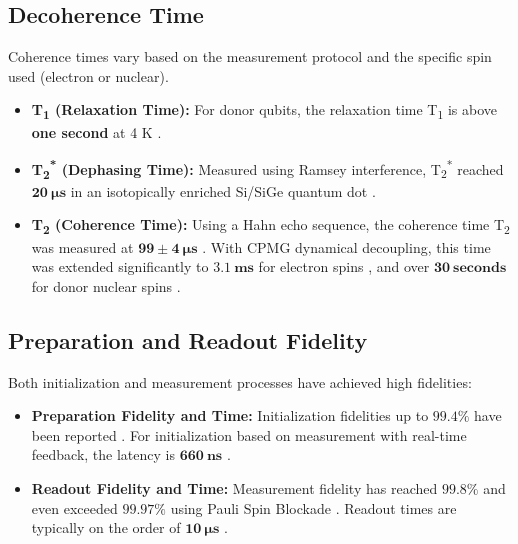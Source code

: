 \subsection{Decoherence Time}
Coherence times vary based on the measurement protocol and the specific spin used (electron or nuclear).
\begin{itemize}
    \item \textbf{T\textsubscript{1} (Relaxation Time):} For donor qubits, the relaxation time T\textsubscript{1} is above \textbf{one second} at 4 K \cite{ref5}.
    \item \textbf{T\textsubscript{2}\textsuperscript{*} (Dephasing Time):} Measured using Ramsey interference, T\textsubscript{2}\textsuperscript{*} reached $\mathbf{20~\mu s}$ in an isotopically enriched Si/SiGe quantum dot \cite{ref4}.
    \item \textbf{T\textsubscript{2} (Coherence Time):} Using a Hahn echo sequence, the coherence time T\textsubscript{2} was measured at $\mathbf{99 \pm 4~\mu s}$ \cite{ref4}. With CPMG dynamical decoupling, this time was extended significantly to $\mathbf{3.1~ms}$ for electron spins \cite{ref4}, and over $\mathbf{30~seconds}$ for donor nuclear spins \cite{ref2}.
\end{itemize}

\subsection{Preparation and Readout Fidelity}
Both initialization and measurement processes have achieved high fidelities:
\begin{itemize}
    \item \textbf{Preparation Fidelity and Time:} Initialization fidelities up to $\mathbf{99.4\%}$ have been reported \cite{ref1}. For initialization based on measurement with real-time feedback, the latency is $\mathbf{660~ns}$ \cite{ref11}.
    \item \textbf{Readout Fidelity and Time:} Measurement fidelity has reached $\mathbf{99.8\%}$ and even exceeded $\mathbf{99.97\%}$ using Pauli Spin Blockade \cite{ref1, ref11}. Readout times are typically on the order of $\mathbf{10~\mu s}$ \cite{ref11}.
\end{itemize}

